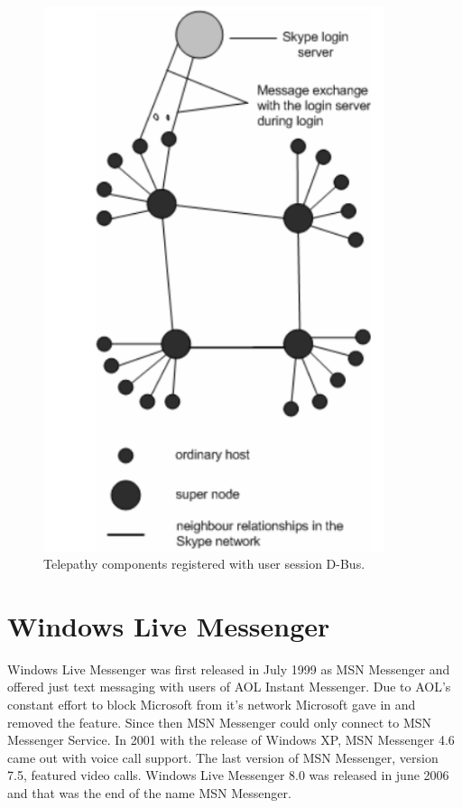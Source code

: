 \begin{figure}[ht]
	\begin{center}
	\includegraphics[width=10cm]{fig/skype-architecture.png}
	\caption{Telepathy components registered with user session D-Bus.\cite{skypeAnalyzed}}
	\label{fig:skypeArchitecture}
\end{center}
\end{figure}

\section*{Windows Live Messenger}
Windows Live Messenger was first released in July 1999 as MSN Messenger and offered just text messaging with users of AOL Instant Messenger\cite{AIM}. Due to AOL's constant effort to block Microsoft from it's network Microsoft gave in and removed the feature. Since then MSN Messenger could only connect to MSN Messenger Service. In 2001 with the release of Windows XP, MSN Messenger 4.6 came out with voice call support. The last version of MSN Messenger, version 7.5, featured video calls. Windows Live Messenger 8.0 was released in june 2006 and that was the end of the name MSN Messenger.   

